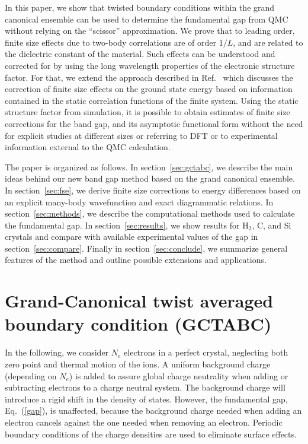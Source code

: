 In this paper, we show that twisted boundary conditions within the grand canonical ensemble
can be used
to  determine the fundamental gap from QMC without relying on the ``scissor'' approximation.
We prove that to leading order, finite size effects due to two-body correlations are of order $1/L$,
and are related to the dielectric constant of the material. Such effects
can be understood and corrected for by using
the long wavelength properties of the electronic
structure factor. 
For that, we extend the approach described in Ref.~\cite{fse,finitesize} 
which discusses the correction
of finite size effects on the ground state energy
based on information contained in the static correlation functions of the finite system.
Using the static structure factor from simulation, it is possible to obtain estimates of finite size corrections 
for the band gap, and its asymptotic functional form 
without the need for
explicit studies at different sizes or referring to DFT or to experimental information
external to the QMC calculation.

The paper is organized as follows. In section~\ref{sec:gctabc}, we describe the main ideas behind our new band gap method based on the grand canonical ensemble. In section~\ref{sec:fse}, we derive finite size corrections to energy differences based on an explicit many-body wavefunction and exact diagrammatic relations. In section~\ref{sec:methods}, we describe the computational methods used to calculate the fundamental gap. In section~\ref{sec:results}, we show results for H$_2$, C, and Si crystals
and compare with available experimental values of the gap in section~\ref{sec:compare}.
Finally in section~\ref{sec:conclude}, we summarize general features of the method
 and outline possible extensions and applications.

\section{Grand-Canonical twist averaged boundary condition (GCTABC)\label{sec:gctabc}}

In the following, we consider $N_e$ electrons in a perfect crystal,
neglecting both zero point  and thermal motion of the ions.
A uniform background charge (depending on $N_e$) is added to assure global 
charge neutrality when adding or subtracting electrons to a charge neutral system.
The background charge will introduce a rigid shift in the density of states. However, the fundamental gap, Eq.~(\ref{gap}), is unaffected,
because the background
charge needed when adding an electron cancels against the one needed when removing an electron.
Periodic boundary conditions of the charge densities are used to eliminate surface effects.

